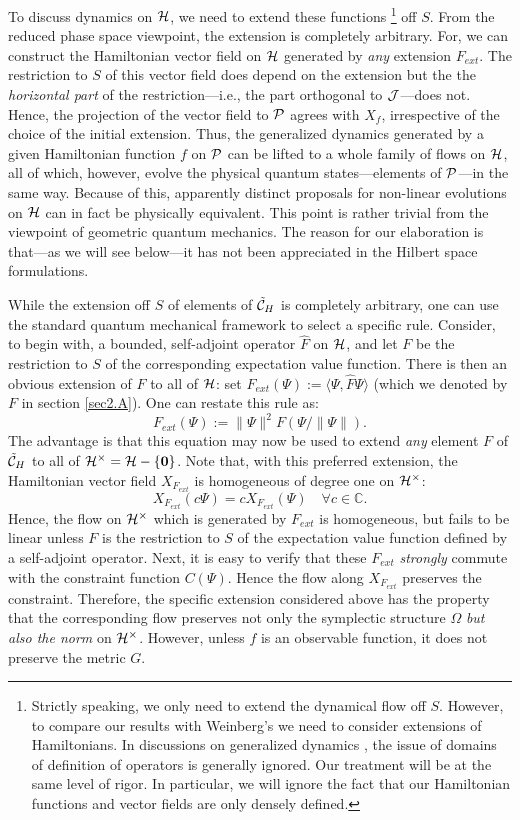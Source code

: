 \documentclass[12pt,aps,eqsecnum,tighten]{revtex4-2}
\def\be{\begin{equation}}
\def\ee{\end{equation}}
\def\<{\langle}
\def\>{\rangle}
\def\C{{\mathbb C}}
\def\H{{\cal H}}
\def\punctH{{\cal H}^{\times}}
\def\P{{\cal P}}
\def\J{{\cal J}}
\newcommand{\hvf}[1]{{X_{#1}}}
\def\C{\mathbb C}
\def\ch{{\cal C}_H}
\begin{document}
To discuss dynamics on $\H$, we need to extend these functions%
%
\footnote{Strictly speaking, we only need to extend the dynamical flow
off $S$. However, to compare our results with Weinberg's \cite{weinberg}
we need to consider extensions of Hamiltonians. In discussions on
generalized dynamics \cite{weinberg,birula}, the issue of domains of
definition of operators is generally ignored. Our treatment will be at
the same level of rigor. In particular, we will ignore the fact that
our Hamiltonian functions and vector fields are only densely
defined.}
%
off $S$. {}From the reduced phase space viewpoint, the extension is
completely arbitrary. For, we can construct the Hamiltonian vector
field on $\H$ generated by {\it any} extension $F_{ext}$.  The
restriction to $S$ of this vector field does depend on the extension
but the the {\it horizontal part} of the restriction---i.e., the part
orthogonal to $\J$---does not. Hence, the projection of the vector
field to $\P$ agrees with $X_f$, irrespective of the choice of the
initial extension. Thus, the generalized dynamics generated by a given
Hamiltonian function $f$ on $\P$ can be lifted to a whole family of
flows on $\H$, all of which, however, evolve the physical quantum
states---elements of $\P$---in the same way. Because of this,
apparently distinct proposals for non-linear evolutions on $\H$ can in
fact be physically equivalent. This point is rather trivial from the
viewpoint of geometric quantum mechanics. The reason for our
elaboration is that---as we will see below---it has not been
appreciated in the Hilbert space formulations.

While the extension off $S$ of elements of $\tilde\ch$ is completely
arbitrary, one can use the standard quantum mechanical framework to
select a specific rule. Consider, to begin with, a bounded,
self-adjoint operator $\hat{F}$ on $\H$, and let $F$ be the
restriction to $S$ of the corresponding expectation value function.
There is then an obvious extension of $F$ to all of $\H$: set
$F_{ext}(\Psi) := \<\Psi, \hat{F}\Psi\>$ (which we denoted by $F$ in
section \ref{sec2.A}). One can restate this rule as:
%
\be\label{f_ext} 
F_{ext}(\Psi) := \|\Psi\|^2 F( \Psi / \|\Psi\| ).  
\ee
%
The advantage is that this equation may now be used to extend {\em
any} element $F$ of $\tilde\ch$ to all of $\punctH = \H-\{{\mathbf
0}\}$. Note that, with this preferred extension, the Hamiltonian
vector field $\hvf{F_{ext}}$ is homogeneous of degree one on
$\punctH$:
%
\be \label{hom}
\hvf{F_{ext}}(c\Psi) = c \hvf{F_{ext}}(\Psi) \quad \forall c\in \C.  
\ee 
%
Hence, the flow on $\punctH$ which is generated by $F_{ext}$ is
homogeneous, but fails to be linear unless $F$ is the restriction to
$S$ of the expectation value function defined by a self-adjoint
operator.  Next, it is easy to verify that these $F_{ext}$ {\em
strongly} commute with the constraint function $C(\Psi)$.  Hence the
flow along $\hvf{F_{ext}}$ preserves the constraint.  Therefore, the
specific extension considered above has the property that the
corresponding flow preserves not only the symplectic structure
$\Omega$ {\it but also the norm} on $\punctH$. However, unless $f$ is
an observable function, it does not preserve the metric $G$.
\end{document}
